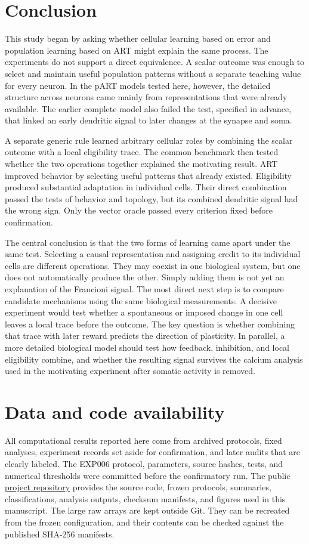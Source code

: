 \documentclass[11pt]{article}
\begin{document}
\section{Conclusion}
This study began by asking whether cellular learning based on error and population learning based on ART might explain the same process. The experiments do not support a direct equivalence. A scalar outcome was enough to select and maintain useful population patterns without a separate teaching value for every neuron. In the pART models tested here, however, the detailed structure across neurons came mainly from representations that were already available. The earlier complete model also failed the test, specified in advance, that linked an early dendritic signal to later changes at the synapse and soma.

A separate generic rule learned arbitrary cellular roles by combining the scalar outcome with a local eligibility trace. The common benchmark then tested whether the two operations together explained the motivating result. ART improved behavior by selecting useful patterns that already existed. Eligibility produced substantial adaptation in individual cells. Their direct combination passed the tests of behavior and topology, but its combined dendritic signal had the wrong sign. Only the vector oracle passed every criterion fixed before confirmation.

The central conclusion is that the two forms of learning came apart under the same test. Selecting a causal representation and assigning credit to its individual cells are different operations. They may coexist in one biological system, but one does not automatically produce the other. Simply adding them is not yet an explanation of the Francioni signal. The most direct next step is to compare candidate mechanisms using the same biological measurements. A decisive experiment would test whether a spontaneous or imposed change in one cell leaves a local trace before the outcome. The key question is whether combining that trace with later reward predicts the direction of plasticity. In parallel, a more detailed biological model should test how feedback, inhibition, and local eligibility combine, and whether the resulting signal survives the calcium analysis used in the motivating experiment after somatic activity is removed.

\section*{Data and code availability}
All computational results reported here come from archived protocols, fixed analyses, experiment records set aside for confirmation, and later audits that are clearly labeled. The EXP006 protocol, parameters, source hashes, tests, and numerical thresholds were committed before the confirmatory run. The public \href{https://github.com/OgnjenX/part-vector-credit}{project repository} provides the source code, frozen protocols, summaries, classifications, analysis outputs, checksum manifests, and figures used in this manuscript. The large raw arrays are kept outside Git. They can be recreated from the frozen configuration, and their contents can be checked against the published SHA-256 manifests.


{\small\setlength{\bibsep}{4pt}}
\end{document}

